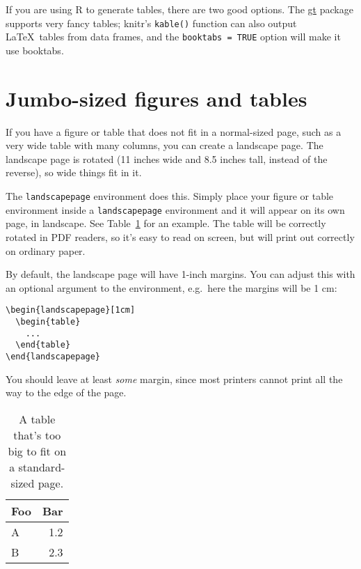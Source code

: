 If you are using R to generate tables, there are two good options. The
\href{https://gt.rstudio.com/}{gt} package supports very fancy tables; knitr's
\texttt{kable()} function can also output \LaTeX\ tables from data frames, and
the \texttt{booktabs = TRUE} option will make it use booktabs.

\section{Jumbo-sized figures and tables}

If you have a figure or table that does not fit in a normal-sized page, such as
a very wide table with many columns, you can create a landscape page. The
landscape page is rotated (11 inches wide and 8.5 inches tall, instead of the
reverse), so wide things fit in it.

The \verb|landscapepage| environment does this. Simply place your figure or
table environment inside a \verb|landscapepage| environment and it will appear
on its own page, in landscape. See Table~\ref{jumbo-table} for an example. The
table will be correctly rotated in PDF readers, so it's easy to read on screen,
but will print out correctly on ordinary paper.

By default, the landscape page will have 1-inch margins. You can adjust this
with an optional argument to the environment, e.g.\ here the margins will be 1
cm:
\begin{verbatim}
\begin{landscapepage}[1cm]
  \begin{table}
    ...
  \end{table}
\end{landscapepage}
\end{verbatim}
You should leave at least \emph{some} margin, since most printers cannot print
all the way to the edge of the page.

\begin{landscapepage}
  \begin{table}
    \centering
    \begin{tabular}{l r}\toprule
      Foo & Bar \\\midrule
      A & 1.2\\
      B & 2.3\\\bottomrule
    \end{tabular}
    \caption[Demonstration extra-wide table]{A table that's too big to fit on a
      standard-sized page.}
    \label{jumbo-table}
  \end{table}
\end{landscapepage}

